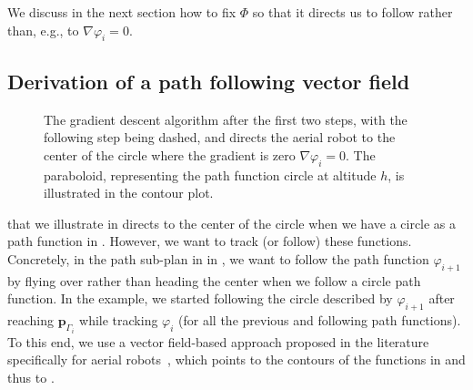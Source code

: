 We discuss in the next section how to fix $\varPhi$ so that it directs us to follow  rather than, e.g., to $\nabla\varphi_i=0$.

\subsection{Derivation of a path following vector field}

\begin{figure}[h!]
  \centering
  \selectfont
  
  \caption[Gradient descent algorithm illustrated on a circle path function]{The gradient descent algorithm after the first two steps, with the following step being dashed, and directs the aerial robot to the center of the circle where the gradient is zero $\nabla\varphi_i=0$. The paraboloid, representing the path function circle at altitude $h$, is illustrated in the contour plot.}
  \label{fig:grad_desc}
\end{figure}
 that we illustrate in  directs to the center of the circle when we have a circle as a path function in .
However, we want to track (or follow) these functions. Concretely, in the path sub-plan in  in , we want to follow the path function $\varphi_{i+1}$ by flying over rather than heading the center when we follow a circle path function. In the example, we started following the circle described by $\varphi_{i+1}$ after reaching $\mathbf{p}_{\Gamma_i}$ while tracking $\varphi_i$ (for all the previous and following path functions). To this end, we use a vector field-based approach proposed in the literature specifically for aerial robots~\citep{de2017guidance}, which points to the contours of the functions in  and thus to .

